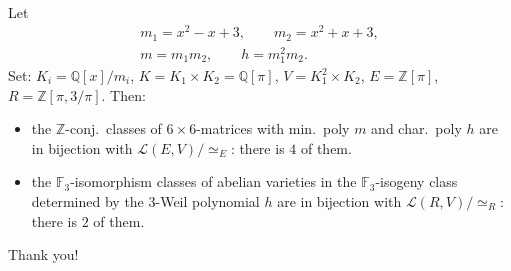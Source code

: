 \documentclass[aspectratio=169,usenames,dvipsnames]{beamer}
\def\Q{\mathbb{Q}}
\def\Z{\mathbb{Z}}
\def\F{\mathbb{F}}
\newcommand{\cL}{{\mathcal L}}
\begin{document}
\begin{frame}{}\
   \begin{example}
      Let
      \vspace*{-2em}
      \begin{gather*}
         m_1 =x^2 - x + 3, \qquad
         m_2 = x^2 + x + 3,\\
         m = m_1m_2, \qquad h =m_1^2m_2.
      \end{gather*}
      \pause
      Set: $K_i=\Q[x]/m_i$, $K=K_1\times K_2=\Q[\pi]$, $V=K_1^2\times K_2$, $E=\Z[\pi]$, $R=\Z[\pi,3/\pi]$.
      \pause
      Then:
      \begin{itemize}
            \item the $\Z$-conj.~classes of $6\times 6$-matrices with min.~poly $m$ and char.~poly $h$ are in bijection with $\cL(E,V)/\simeq_E$: there is $4$ of them.
      \pause
            \item the $\F_3$-isomorphism classes of abelian varieties in the $\F_3$-isogeny class determined by the $3$-Weil polynomial $h$ are in bijection with $\cL(R,V)/\simeq_R$: there is $2$ of them.
      \end{itemize}
   \end{example}
   \vspace*{1em}
   \pause
   \begin{center}
      {\Huge Thank you!}
   \end{center}
\end{frame}

\end{document}
